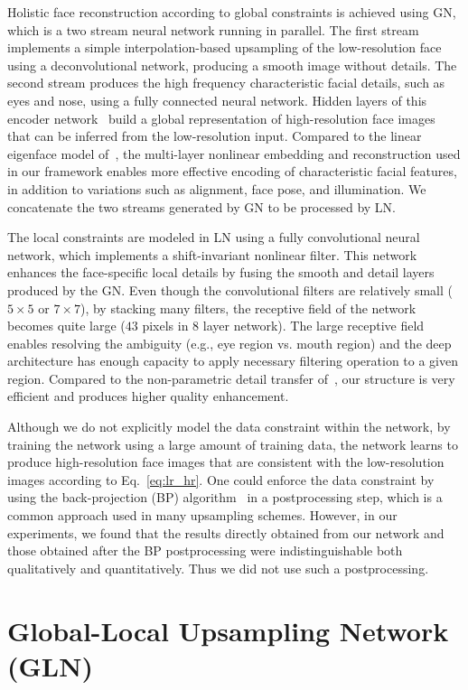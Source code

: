 \documentclass[runningheads]{llncs}
\begin{document}
Holistic face reconstruction according to global constraints is achieved using GN, which is a two stream neural network running in parallel. The first stream implements a simple interpolation-based upsampling of the low-resolution face using a deconvolutional network, producing a smooth image without details. The second stream produces the high frequency characteristic facial details, such as eyes and nose, using a fully connected neural network. Hidden layers of this encoder network~\cite{Hinton06,Vincent08} build a global representation of high-resolution face images that can be inferred from the low-resolution input. Compared to the linear eigenface model of~\cite{Liu07}, the multi-layer nonlinear embedding and reconstruction used in our framework enables  more effective encoding of characteristic facial features, in addition to variations such as alignment, face pose, and illumination. We concatenate the two streams generated by GN to be processed by LN.

The local constraints are modeled in LN using a fully convolutional neural network, which implements a shift-invariant nonlinear filter. This network enhances the face-specific local details by fusing the smooth and detail layers produced by the GN. Even though the convolutional filters are relatively small ($5 \times 5$ or $7 \times 7$), by stacking many filters, the receptive field of the network becomes quite large ($43$ pixels in 8 layer network). The large receptive field enables resolving the ambiguity (e.g., eye region vs. mouth region) and the deep architecture has enough capacity to apply necessary filtering operation to a given region. Compared to the non-parametric detail transfer of~\cite{Liu07}, our structure is very efficient and produces higher quality enhancement.

Although we do not explicitly model the data constraint within the network, by training the network using a large amount of training data, the network learns to produce high-resolution face images that are consistent with the low-resolution images according to Eq.~\eqref{eq:lr_hr}. One could enforce the data constraint by using the back-projection (BP) algorithm~\cite{Irani91} in a postprocessing step, which is a common approach used in many upsampling schemes. However, in our experiments, we found that the results directly obtained from our network and those obtained after the BP postprocessing were indistinguishable both qualitatively and quantitatively. Thus we did not use such a postprocessing.


\section{Global-Local Upsampling Network (GLN)} \label{sec:Upsampling}
\end{document}
